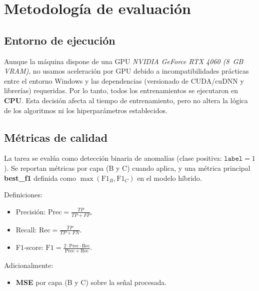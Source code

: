 \section{Metodología de evaluación}

\subsection{Entorno de ejecución} \label{subsec:entorno}
 Aunque la máquina dispone de una GPU \textit{ NVIDIA GeForce RTX 4060 (8~GB VRAM)}, no usamos aceleración por GPU debido a incompatibilidades prácticas entre el entorno Windows y las dependencias (versionado de CUDA/cuDNN y librerías) requeridas. Por lo tanto, todos los entrenamientos se ejecutaron en \textbf{CPU}. Esta decisión afecta al tiempo de entrenamiento, pero no altera la lógica de los algoritmos ni los hiperparámetros establecidos.

\subsection{Métricas de calidad}
La tarea se evalúa como detección binaria de anomalías (clase positiva: \(\texttt{label} = 1\)). Se reportan métricas por capa (B y C) cuando aplica, y una métrica principal \textbf{best\_f1} definida como \(\max(\text{F1}_B, \text{F1}_C)\) en el modelo híbrido.

Definiciones:
\begin{itemize}
    \item Precisión: \(\mathrm{Prec} = \frac{TP}{TP + FP}\).
    \item Recall: \(\mathrm{Rec} = \frac{TP}{TP + FN}\).
    \item F1-score: \(\mathrm{F1} = \frac{2 \cdot \mathrm{Prec} \cdot \mathrm{Rec}}{\mathrm{Prec} + \mathrm{Rec}}\).
\end{itemize}

Adicionalmente:
\begin{itemize}
    \item \textbf{MSE} por capa (B y C) sobre la señal procesada.
\end{itemize}


